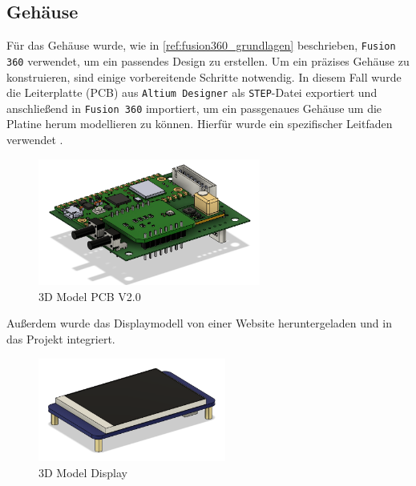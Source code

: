 \begin{inhalt}
\renewcommand*\chapterpagestyle{scrheadings}
\chapter{Gehäuse}

Für das Gehäuse wurde, wie in \ref{ref:fusion360_grundlagen} beschrieben, \texttt{Fusion 360} verwendet, um ein passendes Design zu erstellen.  
Um ein präzises Gehäuse zu konstruieren, sind einige vorbereitende Schritte notwendig.  
In diesem Fall wurde die Leiterplatte (PCB) aus \texttt{Altium Designer} als \texttt{STEP}-Datei exportiert und anschließend in \texttt{Fusion 360} importiert,  
um ein passgenaues Gehäuse um die Platine herum modellieren zu können.  
Hierfür wurde ein spezifischer Leitfaden verwendet \cite{artikel_pcb_way}.


\begin{figure}[!htb]
\centering
\includegraphics[width=0.65\textwidth]{files/Thomas/pics/geheause/pcb_fusion.png}
\caption[3D Model PCB V2.0]{3D Model PCB V2.0}
\label{fig:pcb_v2}
\end{figure}


Außerdem wurde das Displaymodell von einer Website \cite{3d_display_website} heruntergeladen und in das Projekt integriert.


\begin{figure}[!htb]
\centering
\includegraphics[width=0.55\textwidth]{files/Thomas/pics/geheause/display_fusion.png}
\caption[3D Model Display]{3D Model Display}
\label{fig:display_3d}
\end{figure}


\end{inhalt}
